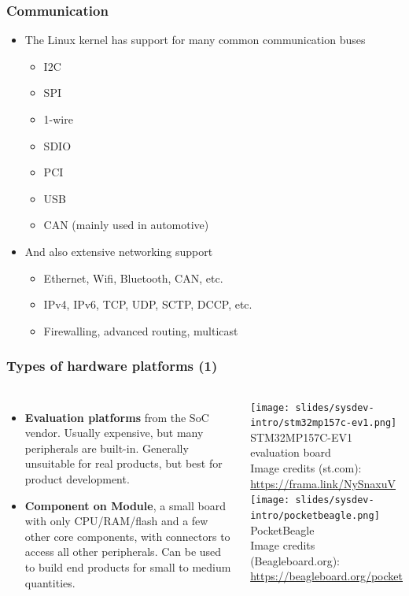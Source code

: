 \begin{frame}
  \frametitle{Communication}
  \begin{itemize}
  \item The Linux kernel has support for many common communication
    buses
    \begin{itemize}
    \item I2C
    \item SPI
    \item 1-wire
    \item SDIO
    \item PCI
    \item USB
    \item CAN (mainly used in automotive)
    \end{itemize}
  \item And also extensive networking support
    \begin{itemize}
    \item Ethernet, Wifi, Bluetooth, CAN, etc.
    \item IPv4, IPv6, TCP, UDP, SCTP, DCCP, etc.
    \item Firewalling, advanced routing, multicast
    \end{itemize}
  \end{itemize}
\end{frame}

\begin{frame}
  \frametitle{Types of hardware platforms (1)}
  \begin{columns}
  \begin{itemize}
  \item {\bf Evaluation platforms} from the SoC vendor. Usually
    expensive, but many peripherals are built-in. Generally unsuitable
    for real products, but best for product development.
  \item {\bf Component on Module}, a small board with only
    CPU/RAM/flash and a few other core components, with connectors to
    access all other peripherals. Can be used to build end products
    for small to medium quantities.
  \end{itemize}
    \texttt{[image: slides/sysdev-intro/stm32mp157c-ev1.png]}
    \scriptsize
    STM32MP157C-EV1 evaluation board\\
    \tiny
    Image credits (st.com):\\
    \url{https://frama.link/NySnaxuV}\\
    \vspace{0.5cm}
    \texttt{[image: slides/sysdev-intro/pocketbeagle.png]}
    \scriptsize
    PocketBeagle\\
    \tiny
    Image credits (Beagleboard.org):\\
    \url{https://beagleboard.org/pocket}
  \end{columns}
\end{frame}

